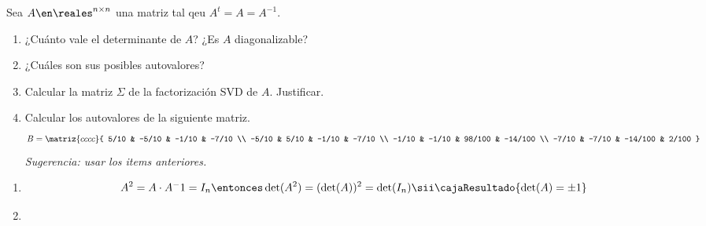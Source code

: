 \begin{enunciado}{\ejExtra} 
  Sea $A \en \reales^{n \times n}$ una matriz tal qeu $A^t = A = A^{-1}$.
  \begin{enumerate}[label=\alph*)]
    \item ¿Cuánto vale el determinante de $A$? ¿Es $A$ diagonalizable?
    \item ¿Cuáles son sus posibles autovalores?
    \item Calcular la matriz $\Sigma$ de la factorización SVD de $A$. Justificar.
    \item Calcular los autovalores de la siguiente matriz.
          $$
            B =
            \matriz{cccc}{
              5/10 & -5/10 & -1/10 & -7/10 \\
              -5/10 & 5/10 & -1/10 & -7/10 \\
              -1/10 & -1/10 & 98/100 & -14/100 \\
              -7/10 & -7/10 & -14/100 & 2/100
            }
          $$
          \textit{Sugerencia: usar los items anteriores.}
  \end{enumerate}
\end{enunciado}

\begin{enumerate}[label=\alph*)]
  \item
        $$
          A^2 = A \cdot A^-1 = I_n
          \entonces \det(A^2) = (\det(A))^2 = \det(I_n) \sii \cajaResultado{\det(A) = \pm 1}
        $$

    \item
        $$
        $$
\end{enumerate}

\begin{aportes}
  \item {}
\end{aportes}
